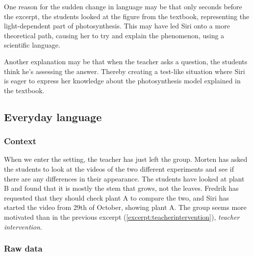 One reason for the sudden change in language may be that only seconds before the excerpt, the students looked at the figure from the textbook, representing the light-dependent part of photosynthesis. This may have led Siri onto a more theoretical path, causing her to try and explain the phenomenon, using a scientific language. 

Another explanation may be that when the teacher asks a question, the students think he's assessing the answer. Thereby creating a test-like situation where Siri is eager to express her knowledge about the photosynthesis model explained in the textbook. 



\subsection{Everyday language}


\subsubsection*{Context}
When we enter the setting, the teacher has just left the group. Morten has asked the students to look at the videos of the two different experiments and see if there are any differences in their appearance. The students have looked at plant B and found that it is mostly the stem that grows, not the leaves. Fredrik has requested that they should check plant A to compare the two, and Siri has started the video from 29th of October, showing plant A. The group seems more motivated than in the previous excerpt (\ref{excerpt:teacherintervention}), \textit{teacher intervention}.


\subsubsection*{Raw data}

